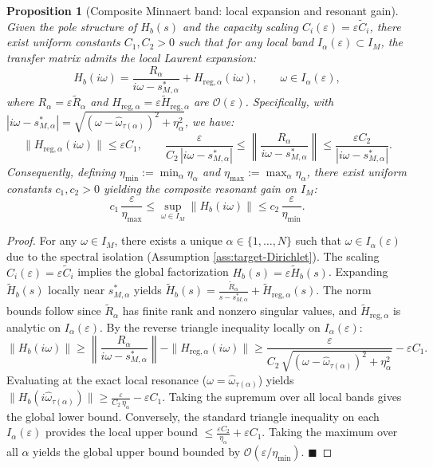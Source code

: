 \documentclass[11pt,a4paper]{article}
\numberwithin{equation}{section}
\newtheorem{proposition}[theorem]{Proposition}
\begin{document}
\begin{proposition}[Composite Minnaert band: local expansion and resonant gain]
\label{prop:Minnaert-gain}
Given the pole structure of $H_b(s)$ and the capacity scaling $C_i(\varepsilon) = \varepsilon \tilde{C}_i$, there exist uniform constants $C_1,C_2>0$ such that for any local band $I_\alpha(\varepsilon) \subset I_M$, the transfer matrix admits the local Laurent expansion:
\[
 H_b(i\omega) = \frac{R_\alpha}{i\omega-s^\ast_{M,\alpha}} + H_{\mathrm{reg},\alpha}(i\omega), \qquad \omega \in I_\alpha(\varepsilon),
\]
where $R_\alpha = \varepsilon \tilde{R}_\alpha$ and $H_{\mathrm{reg},\alpha} = \varepsilon \tilde{H}_{\mathrm{reg},\alpha}$ are $\mathcal{O}(\varepsilon)$. Specifically, with $|i\omega-s^\ast_{M,\alpha}| = \sqrt{(\omega-\hat{\omega}_{\tau(\alpha)})^2+\eta_\alpha^2}$, we have:
\[
 \|H_{\mathrm{reg},\alpha}(i\omega)\|\le \varepsilon C_1,
 \qquad
 \frac{\varepsilon}{C_2\,|i\omega-s^\ast_{M,\alpha}|}
 \le
 \left\|\frac{R_\alpha}{i\omega-s^\ast_{M,\alpha}}\right\|
 \le
 \frac{\varepsilon C_2}{|i\omega-s^\ast_{M,\alpha}|}.
\]
Consequently, defining $\eta_{\min} := \min_\alpha \eta_\alpha$ and $\eta_{\max} := \max_\alpha \eta_\alpha$, there exist uniform constants $c_1,c_2>0$ yielding the composite resonant gain on $I_M$:
\begin{equation}
\label{eq:Minnaert-gain}
 c_1\,\frac{\varepsilon}{\eta_{\max}}
 \le
 \sup_{\omega\in I_M}
 \|H_b(i\omega)\|
 \le
 c_2\,\frac{\varepsilon}{\eta_{\min}}.
\end{equation}
\end{proposition}

\begin{proof}
For any $\omega \in I_M$, there exists a unique $\alpha \in \{1,\dots,N\}$ such that $\omega \in I_\alpha(\varepsilon)$ due to the spectral isolation (Assumption \ref{ass:target-Dirichlet}). The scaling $C_i(\varepsilon) = \varepsilon \tilde{C}_i$ implies the global factorization $H_b(s) = \varepsilon \tilde{H}_b(s)$. Expanding $\tilde{H}_b(s)$ locally near $s^\ast_{M,\alpha}$ yields $\tilde{H}_b(s) = \frac{\tilde{R}_\alpha}{s-s^\ast_{M,\alpha}} + \tilde{H}_{\mathrm{reg},\alpha}(s)$. The norm bounds follow since $\tilde{R}_\alpha$ has finite rank and nonzero singular values, and $\tilde{H}_{\mathrm{reg},\alpha}$ is analytic on $I_\alpha(\varepsilon)$.
\newline
By the reverse triangle inequality locally on $I_\alpha(\varepsilon)$:
\[
 \|H_b(i\omega)\| \ge \left\|\frac{R_\alpha}{i\omega-s^\ast_{M,\alpha}}\right\| - \|H_{\mathrm{reg},\alpha}(i\omega)\| \ge \frac{\varepsilon}{C_2\,\sqrt{(\omega-\hat{\omega}_{\tau(\alpha)})^2+\eta_\alpha^2}} - \varepsilon C_1.
\]
Evaluating at the exact local resonance ($\omega=\hat{\omega}_{\tau(\alpha)}$) yields $\|H_b(i\hat{\omega}_{\tau(\alpha)})\| \ge \frac{\varepsilon}{C_2\,\eta_\alpha} - \varepsilon C_1$. Taking the supremum over all local bands gives the global lower bound. Conversely, the standard triangle inequality on each $I_\alpha(\varepsilon)$ provides the local upper bound $\le \frac{\varepsilon C_2}{\eta_\alpha} + \varepsilon C_1$. Taking the maximum over all $\alpha$ yields the global upper bound bounded by $\mathcal{O}(\varepsilon/\eta_{\min})$. \hfill $\blacksquare$
\end{proof}
\end{document}
